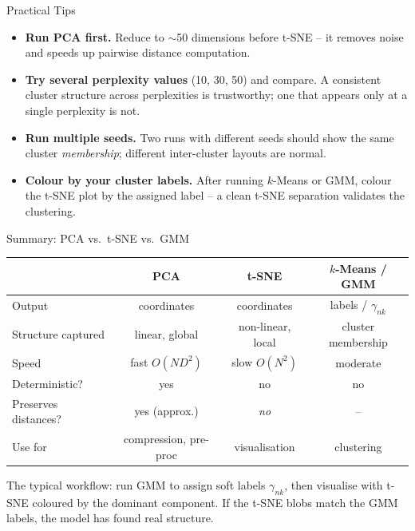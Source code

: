\begin{frame}{Practical Tips}
\begin{itemize}
  \item \textbf{Run PCA first.}  Reduce to $\sim$50 dimensions before t-SNE -- it removes noise and speeds up pairwise distance computation.
  \pause
  \item \textbf{Try several perplexity values} (10, 30, 50) and compare.  A consistent cluster structure across perplexities is trustworthy; one that appears only at a single perplexity is not.
  \pause
  \item \textbf{Run multiple seeds.}  Two runs with different seeds should show the same cluster \emph{membership}; different inter-cluster layouts are normal.
  \pause
  \item \textbf{Colour by your cluster labels.}  After running $k$-Means or GMM, colour the t-SNE plot by the assigned label -- a clean t-SNE separation validates the clustering.
\end{itemize}
\end{frame}

\begin{frame}{Summary: PCA vs.\ t-SNE vs.\ GMM}
\small
\begin{center}
\begin{tabular}{lccc}
\hline
 & \textbf{PCA} & \textbf{t-SNE} & \textbf{$k$-Means / GMM} \\
\hline
Output & coordinates & coordinates & labels / $\gamma_{nk}$ \\
Structure captured & linear, global & non-linear, local & cluster membership \\
Speed & fast $O(ND^2)$ & slow $O(N^2)$ & moderate \\
Deterministic? & yes & no & no \\
Preserves distances? & yes (approx.) & \emph{no} & -- \\
Use for & compression, pre-proc & visualisation & clustering \\
\hline
\end{tabular}
\end{center}

\vspace{0.4em}
\begin{rlintuition}
  The typical workflow: run GMM to assign soft labels $\gamma_{nk}$, then visualise with t-SNE coloured by the dominant component.  If the t-SNE blobs match the GMM labels, the model has found real structure.
\end{rlintuition}
\end{frame}
